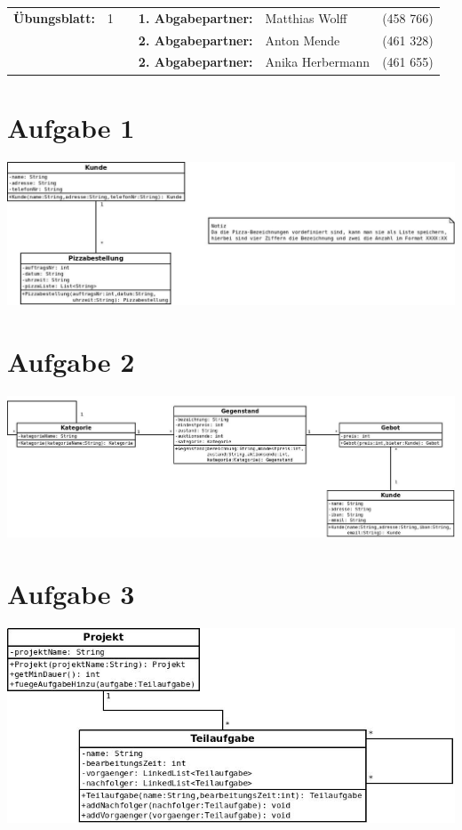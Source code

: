 \newcommand{\obenlinks}{Software Engineering}		%

\usepackage{float}


	\begin{center}
		\begin{tabular}{|rlp{4cm}rll|}
		\hline
		 \textbf{Übungsblatt:} & 1 &   & \textbf{1. Abgabepartner:} & Matthias Wolff & (458 766)  \\
		        & & & \textbf{2. Abgabepartner:} & Anton Mende & (461 328) \\
		        & & & \textbf{2. Abgabepartner:} & Anika Herbermann & (461 655) \\ \hline
		\end{tabular}
	\end{center}
\section*{Aufgabe 1}
\includegraphics[width=\textwidth,height=\textheight,keepaspectratio]{Aufgabe1.jpeg}
\section*{Aufgabe 2}
\includegraphics*[width=\textwidth,height=\textheight,keepaspectratio]{Aufgabe2.jpeg}
\section*{Aufgabe 3}
\includegraphics*[width=\textwidth,height=\textheight,keepaspectratio]{Aufgabe3.jpeg}
